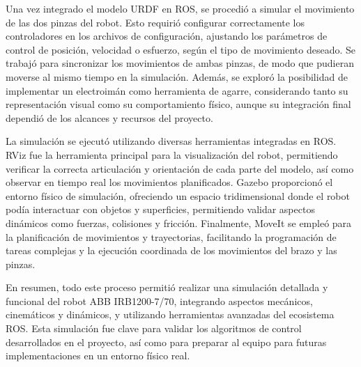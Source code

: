Una vez integrado el modelo URDF en ROS, se procedió a simular el movimiento de las dos pinzas del robot. Esto requirió configurar correctamente los controladores en los archivos de configuración, ajustando los parámetros de control de posición, velocidad o esfuerzo, según el tipo de movimiento deseado. Se trabajó para sincronizar los movimientos de ambas pinzas, de modo que pudieran moverse al mismo tiempo en la simulación. Además, se exploró la posibilidad de implementar un electroimán como herramienta de agarre, considerando tanto su representación visual como su comportamiento físico, aunque su integración final dependió de los alcances y recursos del proyecto.

La simulación se ejecutó utilizando diversas herramientas integradas en ROS. RViz fue la herramienta principal para la visualización del robot, permitiendo verificar la correcta articulación y orientación de cada parte del modelo, así como observar en tiempo real los movimientos planificados. Gazebo proporcionó el entorno físico de simulación, ofreciendo un espacio tridimensional donde el robot podía interactuar con objetos y superficies, permitiendo validar aspectos dinámicos como fuerzas, colisiones y fricción. Finalmente, MoveIt se empleó para la planificación de movimientos y trayectorias, facilitando la programación de tareas complejas y la ejecución coordinada de los movimientos del brazo y las pinzas.

En resumen, todo este proceso permitió realizar una simulación detallada y funcional del robot ABB IRB1200-7/70, integrando aspectos mecánicos, cinemáticos y dinámicos, y utilizando herramientas avanzadas del ecosistema ROS. Esta simulación fue clave para validar los algoritmos de control desarrollados en el proyecto, así como para preparar al equipo para futuras implementaciones en un entorno físico real.